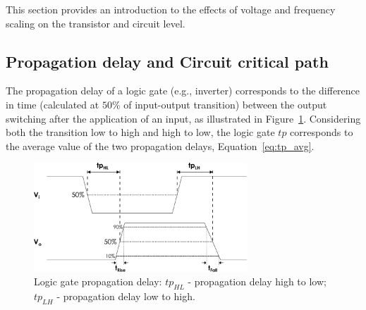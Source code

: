 This section provides an introduction to the effects of voltage and frequency scaling on the transistor and circuit level.





\subsection{Propagation delay and Circuit critical path}

The propagation delay of a logic gate (e.g., inverter) corresponds to the difference in time (calculated at $50\%$ of input-output transition) between the output switching after the application of an input, as illustrated in Figure~\ref{fig:tp}. Considering both the transition low to high and high to low, the logic gate $tp$ corresponds to the average value of the two propagation delays, Equation~\ref{eq:tp_avg}.

\begin{figure}[htb]
    \centering
    \includegraphics[width=80mm]{Figures/Background/propagation_delay.pdf}
    \caption{Logic gate propagation delay: $tp_{HL}$ - propagation delay high to low; $tp_{LH}$ - propagation delay low to high.}
    \label{fig:tp}
\end{figure}

